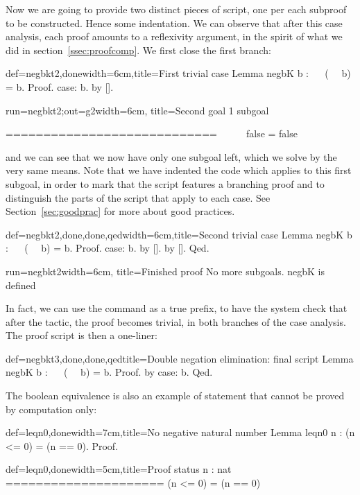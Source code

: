Now we are going to provide two distinct pieces of script, one per
each subproof to be constructed. Hence some indentation. We can
observe that after this case analysis, each proof amounts to a
reflexivity argument, in the spirit of what we did in
section~\ref{ssec:proofcomp}. We first close the first branch:

\begin{coq}{def=negbkt2,done}{width=6cm,title=First trivial case}
Lemma negbK b : ~~ (~~ b) = b.
Proof.
case: b.
  by [].
\end{coq}
\begin{coqout}{run=negbkt2;out=g2}{width=6cm, title=Second goal}
1 subgoal

 ============================
   ~~ ~~ false = false
\end{coqout}

and we can see that we now have only one subgoal left, which we solve
by the very same means. Note that we have indented the code which
applies to this first subgoal, in order to mark that the script
features a branching proof and to distinguish the parts of the script
that apply to each case. See Section~\ref{sec:goodprac} for more about good
practices.


\begin{coq}{def=negbkt2,done,done,qed}{width=6cm,title=Second trivial case}
Lemma negbK b : ~~ (~~ b) = b.
Proof.
case: b.
  by [].
by [].
Qed.
\end{coq}
\begin{coqout}{run=negbkt2}{width=6cm, title=Finished proof}
No more subgoals.
negbK is defined
$~$
$~$
$~$
$~$
\end{coqout}

In fact, we can use the  command as a true prefix, to have the
system check that after the  tactic, the proof becomes
trivial, in both branches of the case analysis. The proof script is
then a one-liner:

\begin{coq}{def=negbkt3,done,done,qed}{title=Double negation elimination: final script}
Lemma negbK b : ~~ (~~ b) = b.
Proof. by case: b. Qed.
\end{coq}

The boolean equivalence  is also an example of statement that
cannot be proved by computation only:

\begin{coq}{def=leqn0,done}{width=7cm,title=No negative natural number}
Lemma leqn0 n : (n <= 0) = (n == 0).
Proof.
\end{coq}
\begin{coqout}{def=leqn0,done}{width=5cm,title=Proof status}
n : nat
=====================
  (n <= 0) = (n == 0)
\end{coqout}

